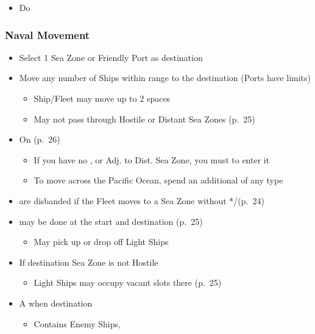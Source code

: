 \documentclass[10pt]{article}
\begin{document}
\begin{itemize}
	\item Do   
\end{itemize}

\subsubsection*{Naval Movement}
\begin{itemize}
	\item Select 1 Sea Zone or Friendly Port as destination
	\item Move any number of Ships within range to the destination (Ports have limits)
	\begin{itemize}
		\item Ship/Fleet may move up to 2 spaces
		\item May not pass through Hostile or Distant Sea Zones (p.~25)
	\end{itemize}
	\item On  (p.~26)
	\begin{itemize}
		\item If you have no \claim, \town or \vassal Adj. to Dist. Sea Zone, you must  to enter it
		\item To move across the Pacific Ocean, spend an additional \monarchpower of any type
	\end{itemize}
	\item {} are disbanded if the Fleet moves to a Sea Zone without */\textdagger\xspace(p.~24)
	\item {} may be done at the start and destination (p.~25)
	\begin{itemize}
		\item May pick up or drop off Light Ships
	\end{itemize}
	\item If destination Sea Zone is not Hostile
	\begin{itemize}
		\item Light Ships may occupy vacant  slots there (p. 25)
	\end{itemize}
	\item A  when destination
	\begin{itemize}
		\item Contains Enemy Ships, 

\end{itemize}
\end{itemize}
\end{document}
